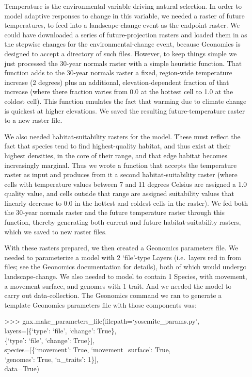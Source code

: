 ﻿\documentclass{article}
\newenvironment{allintypewriter}{\ttfamily}{\par}
\begin{document}
Temperature is the environmental variable driving natural selection. 
In order to model adaptive responses to change in this variable,
we needed a raster of future temperatures,
to feed into a landscape-change event as the endpoint raster.
We could have downloaded a series of future-projection rasters and loaded
them in as the stepwise changes for the environmental-change event,
because Geonomics is designed to accept a directory of such files.
However, to keep things simple we just processed the 30-year normals raster
with a simple heuristic function.
That function adds to the 30-year normals raster a fixed, region-wide
temperature increase (2 degrees) plus an additional, elevation-dependent fraction
of that increase (where there fraction varies from
0.0 at the hottest cell to 1.0 at the coldest cell).
This function emulates the fact that warming due to climate change is quickest at higher elevations.
We saved the resulting future-temperature raster to a new raster file.

We also needed habitat-suitability rasters for the model.
These must reflect the fact that species tend to find highest-quality habitat,
and thus exist at their highest densities, in the core of their range,
and that edge habitat becomes increasingly marginal. 
Thus we wrote a function that accepts the temperature raster as input and produces from
it a second habitat-suitability raster (where cells with temperature values
between 7 and 11 degrees Celsius are assigned a 1.0 quality value,
and cells outside that range are assigned suitability values that linearly decrease
to 0.0 in the hottest and coldest cells in the raster).
We fed both the 30-year normals raster and the future temperature raster through this function,
thereby generating both current and future habitat-suitability rasters,
which we saved to new raster files.

With these rasters prepared, we then created a Geonomics parameters file.
We needed to parameterize a model with 2 `file'-type Layers
(i.e.\ layers red in from files; see the Geonomics documentation for details),
both of which would undergo landscape-change.
We also needed to model to contain 1 Species,
with movement, a movement-surface, and genomes with 1 trait.
And we needed the model to carry out data-collection.
The Geonomics command we ran to generate a template Geonomics parameters
file with those components was:

\begin{allintypewriter}
>>> gnx.make\_parameters\_file(filepath=`yosemite\_params.py',\\
                               layers=[\{`type': `file', `change': True\},\\
                                       \{`type': `file', `change': True\}],\\
                               species=[\{`movement': True, `movement\_surface': True,\\
                                          `genomes': True, `n\_traits': 1\}],\\
                               data=True)\\
\end{allintypewriter}
\end{document}
